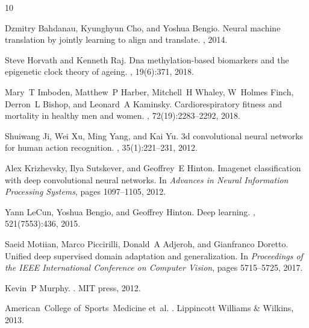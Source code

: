 \documentclass[unnumsec,webpdf,modern,large]{oup-authoring-template}%
\theoremstyle{thmstyleone}%
\theoremstyle{thmstyletwo}%
\theoremstyle{thmstylethree}%
\begin{document}
\begin{thebibliography}{10}


Dzmitry Bahdanau, Kyunghyun Cho, and Yoshua Bengio.
\newblock Neural machine translation by jointly learning to align and translate.
, 2014.

Steve Horvath and Kenneth Raj.
\newblock Dna methylation-based biomarkers and the epigenetic clock theory of ageing.
, 19(6):371, 2018.

Mary~T Imboden, Matthew~P Harber, Mitchell~H Whaley, W~Holmes Finch, Derron~L Bishop, and Leonard~A Kaminsky.
\newblock Cardiorespiratory fitness and mortality in healthy men and women.
, 72(19):2283--2292, 2018.

Shuiwang Ji, Wei Xu, Ming Yang, and Kai Yu.
\newblock 3d convolutional neural networks for human action recognition.
, 35(1):221--231, 2012.

Alex Krizhevsky, Ilya Sutskever, and Geoffrey~E Hinton.
\newblock Imagenet classification with deep convolutional neural networks.
\newblock In {\em Advances in Neural Information Processing Systems}, pages 1097--1105, 2012.

Yann LeCun, Yoshua Bengio, and Geoffrey Hinton.
\newblock Deep learning.
, 521(7553):436, 2015.

Saeid Motiian, Marco Piccirilli, Donald~A Adjeroh, and Gianfranco Doretto.
\newblock Unified deep supervised domain adaptation and generalization.
\newblock In {\em Proceedings of the IEEE International Conference on Computer Vision}, pages 5715--5725, 2017.

Kevin~P Murphy.
.
\newblock MIT press, 2012.

American~College of~Sports~Medicine et~al.
.
\newblock Lippincott Williams \& Wilkins, 2013.


\end{thebibliography}
\end{document}
